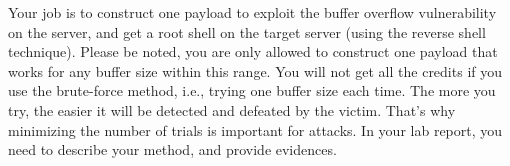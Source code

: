 Your job is to construct one payload to exploit the buffer overflow
vulnerability on the server, and get a root shell on the target server (using
the reverse shell technique). Please be noted, you are only allowed 
to construct one payload that works for any buffer size 
within this range.  You will not get all the credits if you 
use the brute-force method, i.e., trying one buffer size
each time. The more you try, the easier it will be detected 
and defeated by the victim. That's why minimizing the number 
of trials is important for attacks. 
In your lab report, you need to describe your method, 
and provide evidences.


